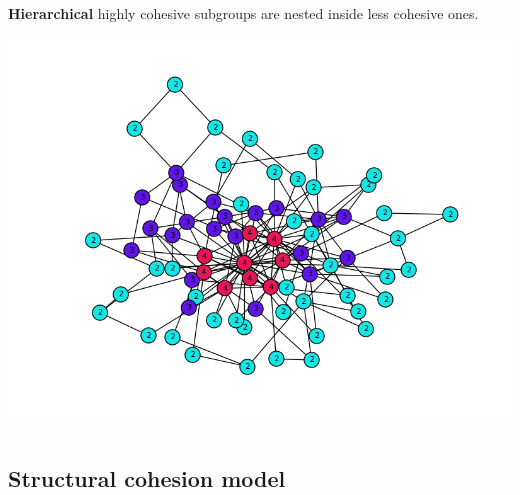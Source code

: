 \documentclass[ignorenonframetext,red,8pt,notes=show]{beamer}
\begin{document}
\begin{frame}[label=]
\begin{columns}[c]
\begin{column}{0.4\textwidth}
\textbf{Hierarchical} highly cohesive subgroups are nested inside less cohesive ones.

\begin{center}
\includegraphics[scale=0.25]{img/knum_colors}
\end{center}
\end{column}

\end{columns}

\end{frame}

\subsection{Structural cohesion model}
\end{document}
